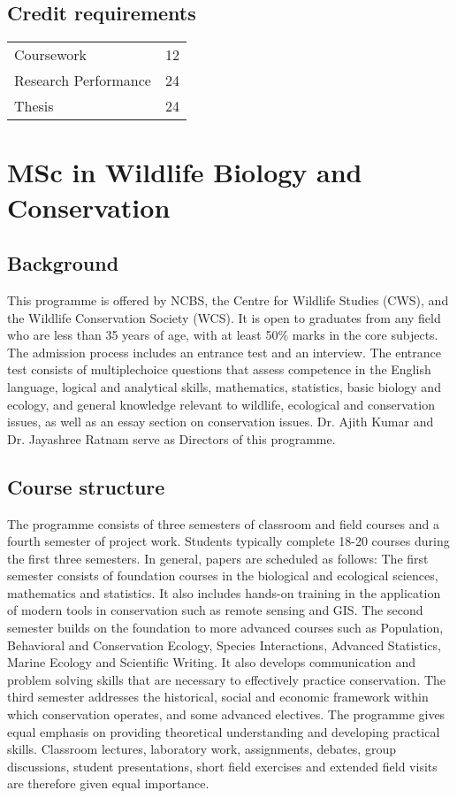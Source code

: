 \documentclass[a4paper]{extarticle}
\begin{document}
\subsection{Credit requirements}
\begin{tabular}{l c}
    Coursework & 12 \\
    Research Performance & 24  \\
    Thesis & 24  \\
\end{tabular}

\section{MSc in Wildlife Biology and Conservation}

\subsection{Background}
This programme is offered by NCBS, the Centre for Wildlife Studies (CWS),
and the Wildlife Conservation Society (WCS). It is open to graduates from any field who are
less than 35 years of age, with at least 50\% marks in the core subjects. The admission
process includes an entrance test and an interview. The entrance test consists of multiplechoice questions that assess competence in the English language, logical and analytical
skills, mathematics, statistics, basic biology and ecology, and general knowledge relevant to
wildlife, ecological and conservation issues, as well as an essay section on conservation
issues. Dr. Ajith Kumar and Dr. Jayashree Ratnam serve as Directors of this programme.

\subsection{Course structure} The programme consists of three semesters of classroom and field
courses and a fourth semester of project work. Students typically complete 18-20 courses
during the first three semesters. In general, papers are scheduled as follows: The first
semester consists of foundation courses in the biological and ecological sciences,
mathematics and statistics. It also includes hands-on training in the application of modern
tools in conservation such as remote sensing and GIS. The second semester builds on the
foundation to more advanced courses such as Population, Behavioral and Conservation
Ecology, Species Interactions, Advanced Statistics, Marine Ecology and Scientific Writing.
It also develops communication and problem solving skills that are necessary to effectively
practice conservation. The third semester addresses the historical, social and economic
framework within which conservation operates, and some advanced electives. The
programme gives equal emphasis on providing theoretical understanding and developing
practical skills. Classroom lectures, laboratory work, assignments, debates, group
discussions, student presentations, short field exercises and extended field visits are
therefore given equal importance.
\end{document}

